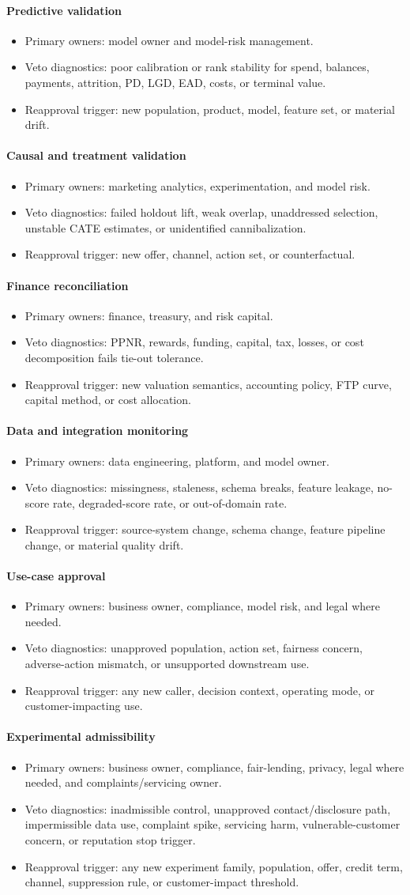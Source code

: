 \documentclass[11pt]{article}
\newcommand{\1}{\mathbf{1}}
\newcommand{\contractitem}[2]{\paragraph{#1}\begin{itemize}[leftmargin=1.5em,itemsep=0.12em,topsep=0.18em]#2\end{itemize}}
\begin{document}
\contractitem{Predictive validation}{
  \item Primary owners: model owner and model-risk management.
  \item Veto diagnostics: poor calibration or rank stability for spend,
        balances, payments, attrition, PD, LGD, EAD, costs, or terminal value.
  \item Reapproval trigger: new population, product, model, feature set, or
        material drift.
}
\contractitem{Causal and treatment validation}{
  \item Primary owners: marketing analytics, experimentation, and model risk.
  \item Veto diagnostics: failed holdout lift, weak overlap, unaddressed
        selection, unstable CATE estimates, or unidentified cannibalization.
  \item Reapproval trigger: new offer, channel, action set, or counterfactual.
}
\contractitem{Finance reconciliation}{
  \item Primary owners: finance, treasury, and risk capital.
  \item Veto diagnostics: PPNR, rewards, funding, capital, tax, losses, or cost
        decomposition fails tie-out tolerance.
  \item Reapproval trigger: new valuation semantics, accounting policy, FTP
        curve, capital method, or cost allocation.
}
\contractitem{Data and integration monitoring}{
  \item Primary owners: data engineering, platform, and model owner.
  \item Veto diagnostics: missingness, staleness, schema breaks, feature
        leakage, no-score rate, degraded-score rate, or out-of-domain rate.
  \item Reapproval trigger: source-system change, schema change, feature
        pipeline change, or material quality drift.
}
\contractitem{Use-case approval}{
  \item Primary owners: business owner, compliance, model risk, and legal where
        needed.
  \item Veto diagnostics: unapproved population, action set, fairness concern,
        adverse-action mismatch, or unsupported downstream use.
  \item Reapproval trigger: any new caller, decision context, operating mode,
        or customer-impacting use.
}
\contractitem{Experimental admissibility}{
  \item Primary owners: business owner, compliance, fair-lending, privacy,
        legal where needed, and complaints/servicing owner.
  \item Veto diagnostics: inadmissible control, unapproved contact/disclosure
        path, impermissible data use, complaint spike, servicing harm,
        vulnerable-customer concern, or reputation stop trigger.
  \item Reapproval trigger: any new experiment family, population, offer,
        credit term, channel, suppression rule, or customer-impact threshold.
}
\end{document}
